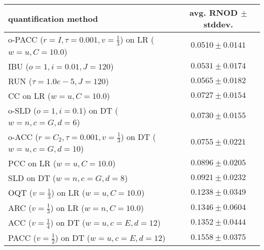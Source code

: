 \begin{tabular}{lc}
  \toprule
  quantification method & avg. RNOD $\pm$ stddev. \\
  \midrule
  o-PACC ($r=I, \tau=0.001, v=\frac{1}{3}$) on LR ($w=u, C=10.0$) & $\mathbf{0.0510 \pm 0.0141}$ \\
  IBU ($o=1, i=0.01, J=120$) & $0.0531 \pm 0.0174$ \\
  RUN ($\tau=1.0e-5, J=120$) & $0.0565 \pm 0.0182$ \\
  CC on LR ($w=u, C=10.0$) & $0.0727 \pm 0.0154$ \\
  o-SLD ($o=1, i=0.1$) on DT ($w=n, c=G, d=6$) & $0.0730 \pm 0.0155$ \\
  o-ACC ($r=C_2, \tau=0.001, v=\frac{1}{3}$) on DT ($w=u, c=G, d=10$) & $0.0755 \pm 0.0221$ \\
  PCC on LR ($w=u, C=10.0$) & $0.0896 \pm 0.0205$ \\
  SLD on DT ($w=n, c=G, d=8$) & $0.0921 \pm 0.0232$ \\
  OQT ($v=\frac{1}{3}$) on LR ($w=u, C=10.0$) & $0.1238 \pm 0.0349$ \\
  ARC ($v=\frac{1}{3}$) on LR ($w=n, C=10.0$) & $0.1346 \pm 0.0604$ \\
  ACC ($v=\frac{1}{4}$) on DT ($w=u, c=E, d=12$) & $0.1352 \pm 0.0444$ \\
  PACC ($v=\frac{1}{2}$) on DT ($w=u, c=E, d=12$) & $0.1558 \pm 0.0375$ \\
  \bottomrule
\end{tabular}
